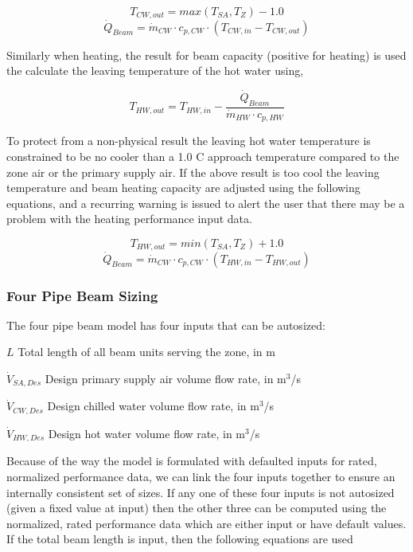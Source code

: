 \[{T_{CW,out}} = { max( {T_{SA}} , {T_{Z}}) - 1.0 }\] \[{\dot Q_{Beam}} = {\dot m_{CW}} \cdot {c_{p,CW}} \cdot {( {T_{CW,in}} - {T_{CW,out}}) }\]

Similarly when heating, the result for beam capacity (positive for heating) is used the calculate the leaving temperature of the hot water using,

\begin{equation}
{T_{HW,out}} = {T_{HW,in}} - \frac{{\dot Q_{Beam}}}{{\dot m_{HW}} \cdot {c_{p,HW}} }
\end{equation}

To protect from a non-physical result the leaving hot water temperature is constrained to be no cooler than a 1.0 C approach temperature compared to the zone air or the primary supply air. If the above result is too cool the leaving temperature and beam heating capacity are adjusted using the following equations, and a recurring warning is issued to alert the user that there may be a problem with the heating performance input data.

\[{T_{HW,out}} = { min( {T_{SA}} , {T_{Z}}) + 1.0 }\] \[{\dot Q_{Beam}} = {\dot m_{CW}} \cdot {c_{p,CW}} \cdot {( {T_{HW,in}} - {T_{HW,out}}) }\]

\subsubsection{Four Pipe Beam Sizing}\label{four-pipe-beam-sizing}

The four pipe beam model has four inputs that can be autosized:

\({L}\) Total length of all beam units serving the zone, in m

\({\dot V_{SA,Des}}\) Design primary supply air volume flow rate, in m\(^{3}\)/s

\({\dot V_{CW,Des}}\) Design chilled water volume flow rate, in m\(^{3}\)/s

\({\dot V_{HW,Des}}\) Design hot water volume flow rate, in m\(^{3}\)/s

Because of the way the model is formulated with defaulted inputs for rated, normalized performance data, we can link the four inputs together to ensure an internally consistent set of sizes. If any one of these four inputs is not autosized (given a fixed value at input) then the other three can be computed using the normalized, rated performance data which are either input or have default values. If the total beam length is input, then the following equations are used

